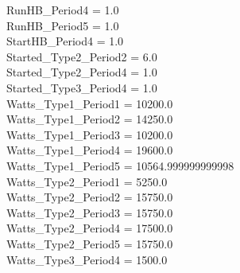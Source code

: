\begin{Parallel}[v]{0.48\textwidth}{0.48\textwidth}
{%
RunHB\_Period4 = 1.0\\
RunHB\_Period5 = 1.0\\
StartHB\_Period4 = 1.0\\
Started\_Type2\_Period2 = 6.0\\
Started\_Type2\_Period4 = 1.0\\
Started\_Type3\_Period4 = 1.0\\
Watts\_Type1\_Period1 = 10200.0\\
Watts\_Type1\_Period2 = 14250.0\\
Watts\_Type1\_Period3 = 10200.0\\
Watts\_Type1\_Period4 = 19600.0\\
Watts\_Type1\_Period5 = 10564.999999999998\\
Watts\_Type2\_Period1 = 5250.0\\
Watts\_Type2\_Period2 = 15750.0\\
Watts\_Type2\_Period3 = 15750.0\\
Watts\_Type2\_Period4 = 17500.0\\
Watts\_Type2\_Period5 = 15750.0\\
Watts\_Type3\_Period4 = 1500.0\\
}
\end{Parallel}